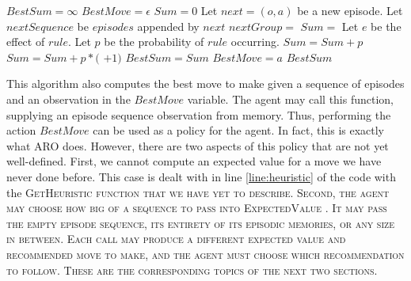 \documentclass[letterpaper]{article} %
\begin{document}
\begin{algorithmic}[1]
		\State $BestSum = \infty$
		\State $BestMove = \epsilon$
			\State $Sum = 0$
			\State Let $next = (o, a)$ be a new episode.
			\State Let $nextSequence$ be $episodes$ appended by $next$
			\State $nextGroup =$  %
				\State $Sum = $  \label{line:heuristic}
			\EndIf
				\State Let $e$ be the effect of $rule$.
				\State Let $p$ be the probability of $rule$ occurring.
					\State $Sum = Sum + p$
				\Else
					\State $Sum = Sum + p*($ $ + 1)$
				\EndIf
			\EndFor
				\State $BestSum = Sum$
				\State $BestMove = a$
			\EndIf
		\EndFor
	\State \Return $BestSum$
	\EndFunction
\end{algorithmic}

This algorithm also computes the best move to make given a sequence of episodes and an observation in the $BestMove$ variable. The agent may call this function, supplying an episode sequence observation from memory. Thus, performing the action $BestMove$ can be used as a policy for the agent. In fact, this is exactly what ARO does. However, there are two aspects of this policy that are not yet well-defined. First, we cannot compute an expected value for a move we have never done before. This case is dealt with in line \ref{line:heuristic} of the code with the \scshape GetHeuristic \normalfont function that we have yet to describe. Second, the agent may choose how big of a sequence to pass into \scshape ExpectedValue \normalfont. It may pass the empty episode sequence, its entirety of its episodic memories, or any size in between. Each call may produce a different expected value and recommended move to make, and the agent must choose which recommendation to follow. These are the corresponding topics of the next two sections.
\end{document}
